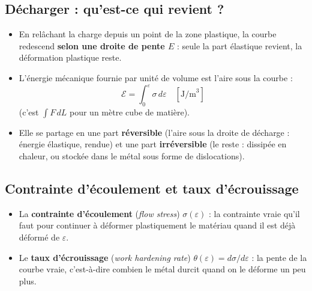 \subsection*{Décharger : qu'est-ce qui revient ?}


\begin{propbox}[title={Décharge et énergie}]
\begin{itemize}
  \item En relâchant la charge depuis un point de la zone plastique, la courbe redescend
        \textbf{selon une droite de pente $E$} : seule la part élastique revient, la
        déformation plastique reste.
  \item L'énergie mécanique fournie par unité de volume est l'aire sous la courbe :
        \[ \mathcal{E} = \int_0^{\varepsilon} \sigma\,d\varepsilon \quad [\text{J/m}^3] \]
        (c'est $\int F\,dL$ pour un mètre cube de matière).
  \item Elle se partage en une part \textbf{réversible} (l'aire sous la droite de
        décharge : énergie élastique, rendue) et une part \textbf{irréversible} (le reste :
        dissipée en chaleur, ou stockée dans le métal sous forme de dislocations).
\end{itemize}
\end{propbox}

\subsection*{Contrainte d'écoulement et taux d'écrouissage}

\begin{defnbox}[title=Deux grandeurs que l'on réutilise sans cesse]
\begin{itemize}
  \item La \textbf{contrainte d'écoulement} (\emph{flow stress}) $\sigma(\varepsilon)$ : la
        contrainte vraie qu'il faut pour continuer à déformer plastiquement le matériau quand
        il est déjà déformé de $\varepsilon$.
  \item Le \textbf{taux d'écrouissage} (\emph{work hardening rate})
        $\theta(\varepsilon) = d\sigma/d\varepsilon$ : la pente de la courbe vraie, c'est-à-dire
        \og combien le métal durcit\fg{} quand on le déforme un peu plus.
\end{itemize}
\end{defnbox}

